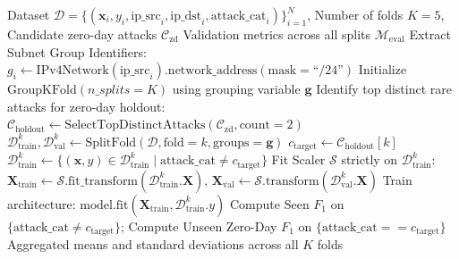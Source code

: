 \documentclass[10pt,a4paper]{article}
\begin{document}
\begin{algorithm}[!ht]
\caption{Subnet-Isolated Anti-Leakage Partitioning with Active Zero-Day Induction}
\label{alg:partitioning}
\begin{algorithmic}[1]
\REQUIRE Dataset $\mathcal{D} = \{(\mathbf{x}_i, y_i, \text{ip\_src}_i, \text{ip\_dst}_i, \text{attack\_cat}_i)\}_{i=1}^N$, Number of folds $K=5$, Candidate zero-day attacks $\mathcal{C}_{\text{zd}}$
\ENSURE Validation metrics across all splits $\mathcal{M}_{\text{eval}}$
\STATE Extract Subnet Group Identifiers: $g_i \leftarrow \text{IPv4Network}(\text{ip\_src}_i).\text{network\_address}(\text{mask}=\text{``/24''})$
\STATE Initialize $\text{GroupKFold}(n\_splits = K)$ using grouping variable $\mathbf{g}$
\STATE Identify top distinct rare attacks for zero-day holdout: $\mathcal{C}_{\text{holdout}} \leftarrow \text{SelectTopDistinctAttacks}(\mathcal{C}_{\text{zd}}, \text{count}=2)$
    \STATE $\mathcal{D}_{\text{train}}^k, \mathcal{D}_{\text{val}}^k \leftarrow \text{SplitFold}(\mathcal{D}, \text{fold}=k, \text{groups}=\mathbf{g})$
        \STATE $c_{\text{target}} \leftarrow \mathcal{C}_{\text{holdout}}[k]$
        \STATE $\mathcal{D}_{\text{train}}^k \leftarrow \{(\mathbf{x}, y) \in \mathcal{D}_{\text{train}}^k \mid \text{attack\_cat} \neq c_{\text{target}}\}$
    \ENDIF
    \STATE Fit Scaler $\mathcal{S}$ strictly on $\mathcal{D}_{\text{train}}^k$: $\mathbf{X}_{\text{train}} \leftarrow \mathcal{S}.\text{fit\_transform}(\mathcal{D}_{\text{train}}^k.\mathbf{X})$, $\mathbf{X}_{\text{val}} \leftarrow \mathcal{S}.\text{transform}(\mathcal{D}_{\text{val}}^k.\mathbf{X})$
    \STATE Train architecture: $\text{model}.\text{fit}(\mathbf{X}_{\text{train}}, \mathcal{D}_{\text{train}}^k.y)$
    \STATE Compute Seen $F_1$ on $\{\text{attack\_cat} \neq c_{\text{target}}\}$; Compute Unseen Zero-Day $F_1$ on $\{\text{attack\_cat} == c_{\text{target}}\}$
\ENDFOR
\RETURN Aggregated means and standard deviations across all $K$ folds
\end{algorithmic}
\end{algorithm}
\end{document}
